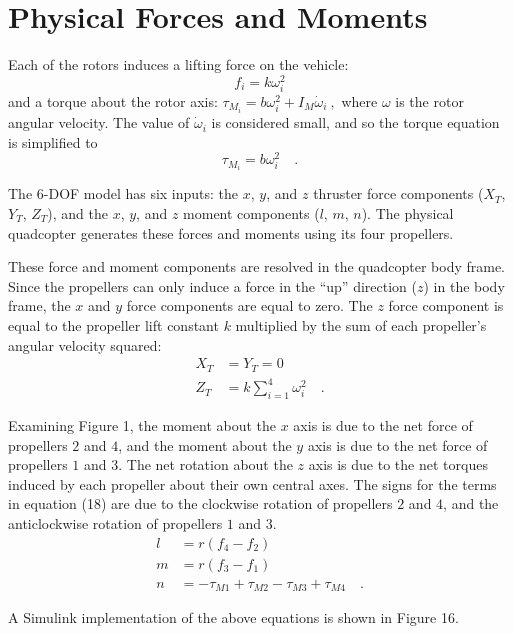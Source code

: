 \section*{Physical Forces and Moments}

Each of the rotors induces a lifting force on the vehicle:
\begin{equation}
    f_{i} = k \omega_i^2
\end{equation}
and a torque about the rotor axis: $\tau_{M_{i}} = b \omega_i^2 + I_M \dot{\omega}_i ~,$ where $\omega$ is the rotor angular velocity. The value of $\dot{\omega}_i$ is considered small, and so the torque equation is simplified to 
\begin{equation}
    \tau_{M_{i}} = b \omega_i^2 \quad .
\end{equation}

The 6-DOF model has six inputs: the $x$, $y$, and $z$ thruster force components ($X_T$, $Y_T$, $Z_T$), and the $x$, $y$, and $z$ moment components ($l$, $m$, $n$). The physical quadcopter generates these forces and moments using its four propellers.

These force and moment components are resolved in the quadcopter body frame. Since the propellers can only induce a force in the ``up'' direction ($z$) in the body frame, the $x$ and $y$ force components are equal to zero. The $z$ force component is equal to the propeller lift constant $k$ multiplied by the sum of each propeller's angular velocity squared:
\begin{align}
    X_T &= Y_T = 0 \\
    Z_T &= k\sum_{i=1}^{4}\omega_i^2 \quad .
\end{align}

Examining Figure 1, the moment about the $x$ axis is due to the net force of propellers $2$ and $4$, and the moment about the $y$ axis is due to the net force of propellers $1$ and $3$. The net rotation about the $z$ axis is due to the net torques induced by each propeller about their own central axes. The signs for the terms in equation (18) are due to the clockwise rotation of propellers $2$ and $4$, and the anticlockwise rotation of propellers $1$ and $3$.
\begin{align}
    l &= r(f_4 - f_2) \\
    m &= r(f_3 - f_1) \\
    n &= -\tau_{M1} + \tau_{M2} - \tau_{M3} + \tau_{M4} \quad .
\end{align}

A Simulink implementation of the above equations is shown in Figure 16.